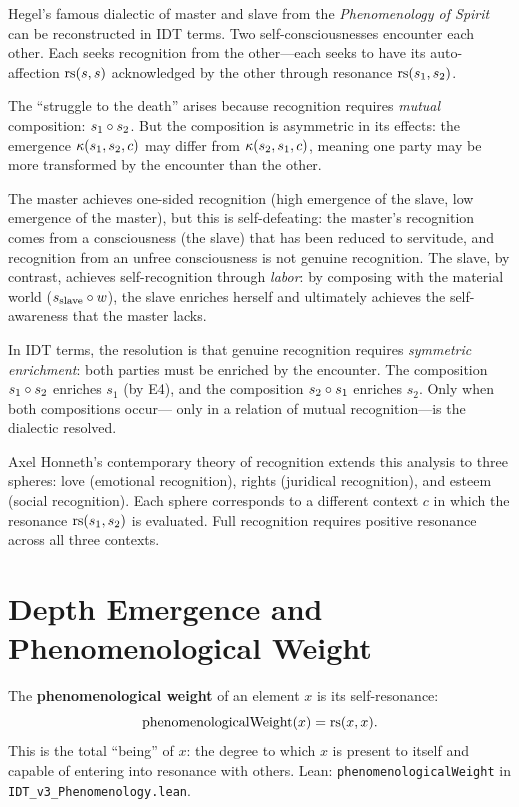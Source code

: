 \begin{interpretation}
\label{interp:hegel-recognition}
Hegel's famous dialectic of master and slave from the \textit{Phenomenology
of Spirit} can be reconstructed in IDT terms.  Two self-consciousnesses
encounter each other.  Each seeks recognition from the other---each seeks
to have its auto-affection $\mathrm{rs}(s, s)$ acknowledged by the other through
resonance $\mathrm{rs}(s_1, s_2)$.

The ``struggle to the death'' arises because recognition requires
\emph{mutual} composition: $s_1 \circ s_2$.  But the composition is
asymmetric in its effects: the emergence $\kappa(s_1, s_2, c)$ may differ
from $\kappa(s_2, s_1, c)$, meaning one party may be more transformed by
the encounter than the other.

The master achieves one-sided recognition (high emergence of the slave,
low emergence of the master), but this is self-defeating: the master's
recognition comes from a consciousness (the slave) that has been reduced
to servitude, and recognition from an unfree consciousness is not genuine
recognition.  The slave, by contrast, achieves self-recognition through
\emph{labor}: by composing with the material world ($s_{\text{slave}} \circ w$),
the slave enriches herself and ultimately achieves the self-awareness
that the master lacks.

In IDT terms, the resolution is that genuine recognition requires
\emph{symmetric enrichment}: both parties must be enriched by the encounter.
The composition $s_1 \circ s_2$ enriches $s_1$ (by E4), and the composition
$s_2 \circ s_1$ enriches $s_2$.  Only when both compositions occur---
only in a relation of mutual recognition---is the dialectic resolved.

Axel Honneth's contemporary theory of recognition extends this analysis to
three spheres: love (emotional recognition), rights (juridical recognition),
and esteem (social recognition).  Each sphere corresponds to a different
context $c$ in which the resonance $\mathrm{rs}(s_1, s_2)$ is evaluated.  Full
recognition requires positive resonance across all three contexts.
\end{interpretation}

\section{Depth Emergence and Phenomenological Weight}

\begin{definition}
\label{def:phenom-weight}
The \textbf{phenomenological weight} of an element $x$ is its self-resonance:
\[
\mathrm{phenomenologicalWeight}(x) = \mathrm{rs}(x, x).
\]
This is the total ``being'' of $x$: the degree to which $x$ is present
to itself and capable of entering into resonance with others.
Lean: \texttt{phenomenologicalWeight} in \texttt{IDT\_v3\_Phenomenology.lean}.
\end{definition}

